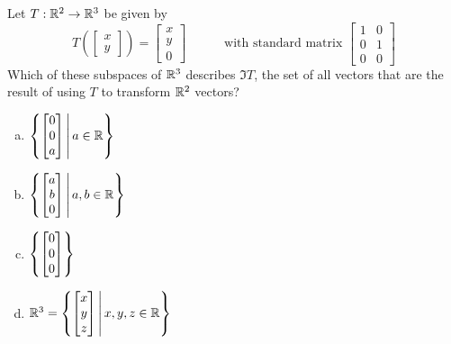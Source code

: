 \begin{activity}{5}
Let \(T: \mathbb{R}^2 \rightarrow \mathbb{R}^3\) be given by
\[
  T\left(\begin{bmatrix}x \\ y \end{bmatrix} \right)
    =
  \begin{bmatrix} x \\ y \\ 0 \end{bmatrix}
    \hspace{3em}
    \text{with standard matrix }
  \begin{bmatrix} 1 & 0 \\ 0 & 1 \\ 0 & 0 \end{bmatrix}
\]
Which of these subspaces of \(\mathbb{R}^3\) describes \(\Im T\),
the set of all vectors that are the result of using \(T\) to transform
\(\mathbb{R}^2\) vectors?
\begin{multicols}{2}
\begin{enumerate}[a)]
\item \(\left\{\begin{bmatrix}0 \\ 0\\ a\end{bmatrix}\,\middle|\,a\in\mathbb{R}\right\}\)
\item \(\left\{\begin{bmatrix}a \\ b\\ 0\end{bmatrix}\,\middle|\,a,b\in\mathbb{R}\right\}\)
\item \(\left\{\begin{bmatrix}0\\0\\0\end{bmatrix}\right\}\)
\item \(\mathbb{R}^3=\left\{\begin{bmatrix}x \\ y\\z\end{bmatrix}\,\middle|\,x,y,z\in\mathbb{R}\right\}\)
\end{enumerate}
\end{multicols}
\end{activity}

